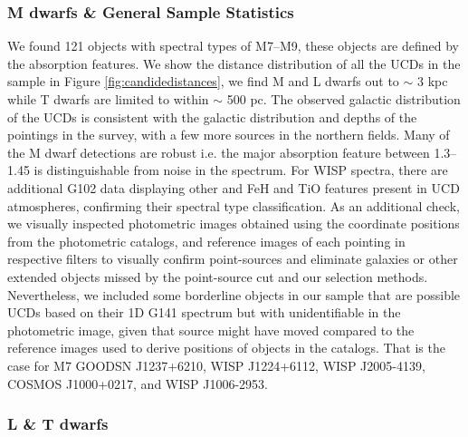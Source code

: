 \documentclass[manuscript]{aastex63}
\begin{document}
\subsubsection{M dwarfs \& General Sample Statistics}
We found 121 objects with spectral types of M7--M9, these objects are defined by the \wat absorption features. We show the distance distribution of all the UCDs in the sample in Figure \ref{fig:candidedistances}, we find M and L dwarfs out to $\sim$ 3 kpc while T dwarfs are limited to within $\sim$ 500 pc. The observed galactic distribution of the UCDs is consistent with the galactic distribution and depths of the pointings in the survey, with a few more sources in the northern fields. Many of the M dwarf detections are robust i.e. the major \wat absorption feature between 1.3--1.45 \micron is distinguishable from noise in the spectrum. For WISP spectra, there are additional G102 data displaying other \wat and FeH and TiO features present in UCD atmospheres, confirming their spectral type classification. As an additional check, we visually inspected photometric images obtained using the coordinate positions from the photometric catalogs, and reference images of each pointing in respective filters to visually confirm point-sources and eliminate galaxies or other extended objects missed by the point-source cut and our selection methods. Nevertheless, we included some borderline objects in our sample that are possible UCDs based on their 1D G141 spectrum but with unidentifiable in the photometric image, given that source might have moved compared to the reference images used to derive positions of objects in the catalogs. That is the case for M7 GOODSN J1237+6210,  WISP J1224+6112, WISP J2005-4139, COSMOS J1000+0217, and WISP J1006-2953.

\subsubsection{ L \& T dwarfs}
\end{document}
